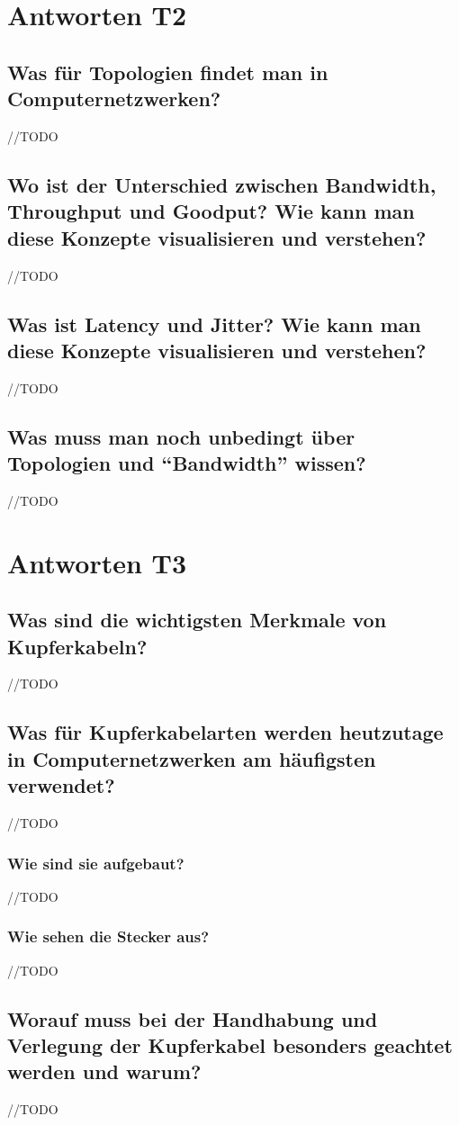 \section{Antworten T2}
\subsection*{Was für Topologien findet man in Computernetzwerken?}
//TODO
\subsection*{Wo ist der Unterschied zwischen \flqq{}Bandwidth\frqq, \flqq{}Throughput\frqq{} und \flqq{}Goodput\frqq? Wie kann man diese Konzepte visualisieren und verstehen?}
//TODO
\subsection*{Was ist \flqq{}Latency\frqq{} und \flqq{}Jitter\frqq? Wie kann man diese Konzepte visualisieren und verstehen?}
//TODO
\subsection*{Was muss man noch unbedingt über Topologien und ``Bandwidth'' wissen?}
//TODO

\section{Antworten T3}
\subsection*{Was sind die wichtigsten Merkmale von Kupferkabeln?}
//TODO
\subsection*{Was für Kupferkabelarten werden heutzutage in Computernetzwerken am häufigsten verwendet?}
//TODO
\subsubsection*{Wie sind sie aufgebaut?}
//TODO
\subsubsection*{Wie sehen die Stecker aus?}
//TODO
\subsection*{Worauf muss bei der Handhabung und Verlegung der Kupferkabel besonders geachtet werden und warum?}
//TODO

